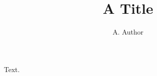 \documentclass{svmult}
\begin{document}
\title*{A Title}
\author{A. Author}
\maketitle
Text.
\end{document}
